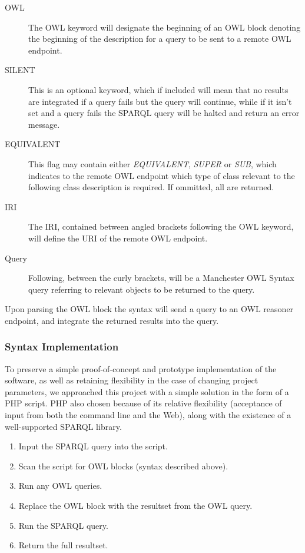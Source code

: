 \documentclass{article}
\begin{document}
\begin{description}
    \item[OWL] The OWL keyword will designate the beginning of an OWL block
    denoting the beginning of the description for a query to be sent to a remote
    OWL endpoint.
    \item[SILENT] This is an optional keyword, which if included will mean that
    no results are integrated if a query fails but the query will continue,
    while if it isn't set and a query fails the SPARQL query will be halted and
    return an error message.
    \item[EQUIVALENT] This flag may contain either \emph{EQUIVALENT},
    \emph{SUPER} or \emph{SUB}, which indicates to the remote OWL endpoint
    which type of class relevant to the following class description is required.
    If ommitted, all are returned.
    \item[IRI] The IRI, contained between angled brackets following the OWL
    keyword, will define the URI of the remote OWL endpoint.
    \item[Query] Following, between the curly brackets, will be a Manchester OWL
    Syntax query referring to relevant objects to be returned to the query.
\end{description}

Upon parsing the OWL block the syntax will send a query to an OWL reasoner
endpoint, and integrate the returned results into the query. 

\subsubsection{Syntax Implementation}

To preserve a simple proof-of-concept and prototype implementation of the
software, as well as retaining flexibility in the case of changing project
parameters, we approached this project with a simple solution in the form of a
PHP script. PHP also chosen because of its relative flexibility (acceptance of
input from both the command line and the Web), along with the existence of a
well-supported SPARQL library.

\begin{enumerate}
    \item Input the SPARQL query into the script.
    \item Scan the script for OWL blocks (syntax described above).
    \item Run any OWL queries.
    \item Replace the OWL block with the resultset from the OWL query.
    \item Run the SPARQL query.
    \item Return the full resultset.
\end{enumerate}
\end{document}
